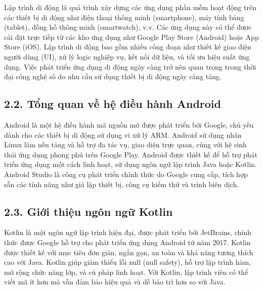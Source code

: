 \documentclass[12pt,a4paper]{article}
\begin{document}
	\noindent
	Lập trình di động là quá trình xây dựng các ứng dụng phần mềm hoạt động trên các thiết bị di động như điện thoại thông minh (smartphone), máy tính bảng (tablet), đồng hồ thông minh (smartwatch), v.v. Các ứng dụng này có thể được cài đặt trực tiếp từ các kho ứng dụng như Google Play Store (Android) hoặc App Store (iOS). Lập trình di động bao gồm nhiều công đoạn như thiết kế giao diện người dùng (UI), xử lý logic nghiệp vụ, kết nối dữ liệu, và tối ưu hiệu suất ứng dụng. Việc phát triển ứng dụng di động ngày càng trở nên quan trọng trong thời đại công nghệ số do nhu cầu sử dụng thiết bị di động ngày càng tăng.
	
	\vspace{0.7cm}
	
	\subsection*{2.2. Tổng quan về hệ điều hành Android}
	\vspace{0.1cm}
	
	\noindent
	Android là một hệ điều hành mã nguồn mở được phát triển bởi Google, chủ yếu dành cho các thiết bị di động sử dụng vi xử lý ARM. Android sử dụng nhân Linux làm nền tảng và hỗ trợ đa tác vụ, giao diện trực quan, cùng với hệ sinh thái ứng dụng phong phú trên Google Play. Android được thiết kế để hỗ trợ phát triển ứng dụng một cách linh hoạt, sử dụng ngôn ngữ lập trình Java hoặc Kotlin. Android Studio là công cụ phát triển chính thức do Google cung cấp, tích hợp sẵn các tính năng như giả lập thiết bị, công cụ kiểm thử và trình biên dịch.
	
	\vspace{0.7cm}
	
	\subsection*{2.3. Giới thiệu ngôn ngữ Kotlin}
	\vspace{0.1cm}
	
	\noindent
	Kotlin là một ngôn ngữ lập trình hiện đại, được phát triển bởi JetBrains, chính thức được Google hỗ trợ cho phát triển ứng dụng Android từ năm 2017. Kotlin được thiết kế với mục tiêu đơn giản, ngắn gọn, an toàn và khả năng tương thích cao với Java. Kotlin giúp giảm thiểu lỗi null (null safety), hỗ trợ lập trình hàm, mở rộng chức năng lớp, và cú pháp linh hoạt. Với Kotlin, lập trình viên có thể viết mã ít hơn mà vẫn đảm bảo hiệu quả và dễ bảo trì hơn so với Java.
	
\end{document}
